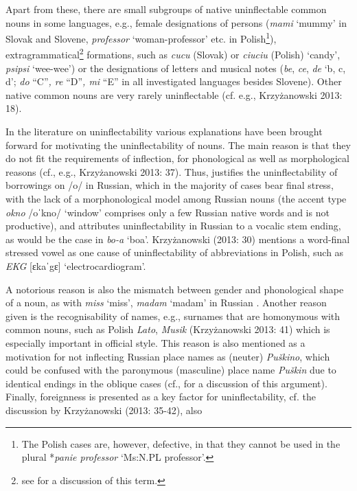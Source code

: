 \documentclass[output=paper]{langscibook}
\begin{document}
Apart from these, there are small subgroups of native uninflectable common nouns in some languages, e.g., female designations of persons (\textit{mami} ‘mummy’ in Slovak and Slovene, \textit{professor} ‘woman-professor’ etc. in Polish\footnote{ \textrm{The Polish cases are, however, defective, in that they cannot be used in the plural *}\textrm{\textit{panie professor} }\textrm{‘Ms:N.PL professor’.}}), extragrammatical\footnote{ \textrm{see \citet{Dressler2000} for a discussion of this term.}} formations, such as \textit{cucu} (Slovak) or \textit{ciuciu} (Polish) ‘candy’, \textit{psipsi} ‘wee-wee’) or the designations of letters and musical notes (\textit{be}, \textit{ce}, \textit{de} ‘b, c, d’; \textit{do} “C”\textit{, re} “D”\textit{, mi} “E” in all investigated languages besides Slovene). Other native common nouns are very rarely uninflectable (cf. e.g., Krzyżanowski 2013: 18). 

In the literature on uninflectability various explanations have been brought forward for motivating the uninflectability of nouns. The main reason is that they do not fit the requirements of inflection, for phonological as well as morphological reasons (cf., e.g., Krzyżanowski 2013: 37). Thus, \citet[225]{Isačenko1954} justifies the uninflectability of borrowings on /o/ in Russian, which in the majority of cases bear final stress, with the lack of a morphonological model among Russian nouns (the accent type \textit{okno} /oˈkno/ ‘window’ comprises only a few Russian native words and is not productive), and \citet{Worth1966} attributes uninflectability in Russian to a vocalic stem ending, as would be the case in \textit{bo-a} ‘boa’. Krzyżanowski (2013: 30) mentions a word-final stressed vowel as one cause of uninflectability of abbreviations in Polish, such as \textit{EKG} [ɛkaˈgɛ] ‘electrocardiogram’. 

A notorious reason is also the mismatch between gender and phonological shape of a noun, as with \textit{miss} ‘miss’, \textit{madam} ‘madam’ in Russian \citep[148]{Timberlake2004}. Another reason given is the recognisability of names, e.g., surnames that are homonymous with common nouns, such as Polish \textit{Lato}, \textit{Musik} (Krzyżanowski 2013: 41) which is especially important in official style. This reason is also mentioned as a motivation for not inflecting Russian place names as (neuter) \textit{Puškino}, which could be confused with the paronymous (masculine) place name \textit{Puškin} due to identical endings in the oblique cases (cf., \citealt{Tejkin2021} for a discussion of this argument). Finally, foreignness is presented as a key factor for uninflectability, cf. the discussion by Krzyżanowski (2013: 35-42), also \citet[1075-1076]{Tejkin2021}
\end{document}
